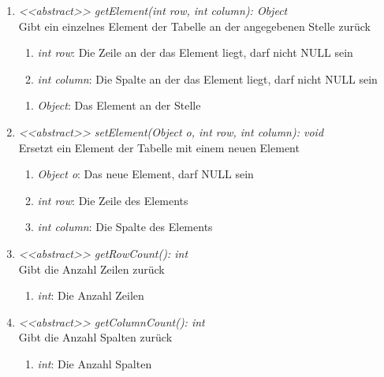 \begin{enumerate}[+]
	\item \textit{<{<abstract>}> getElement(int row, int column): Object} \\
	Gibt ein einzelnes Element der Tabelle an der angegebenen Stelle zurück
	\begin{enumerate}[$\bullet$]
		\item \textit{int row}: Die Zeile an der das Element liegt, darf nicht NULL sein
		\item \textit{int column}: Die Spalte an der das Element liegt, darf nicht NULL sein
	\end{enumerate}
	\vspace{-0.2cm}
	\begin{enumerate}[$\circ$]
		\item \textit{Object}: Das Element an der Stelle
	\end{enumerate}
	
	\item \textit{<{<abstract>}> setElement(Object o, int row, int column): void} \\
	Ersetzt ein Element der Tabelle mit einem neuen Element
	\begin{enumerate}[$\bullet$]
		\item \textit{Object o}: Das neue Element, darf NULL sein
		\item \textit{int row}: Die Zeile des Elements
		\item \textit{int column}: Die Spalte des Elements
	\end{enumerate}
	\vspace{-0.2cm}
	
	\item \textit{<{<abstract>}> getRowCount(): int} \\
	Gibt die Anzahl Zeilen zurück
	\vspace{-0.2cm}
	\begin{enumerate}[$\circ$]
		\item \textit{int}: Die Anzahl Zeilen
	\end{enumerate}

	\item \textit{<{<abstract>}> getColumnCount(): int} \\
	Gibt die Anzahl Spalten zurück
	\vspace{-0.2cm}
	\begin{enumerate}[$\circ$]
		\item \textit{int}: Die Anzahl Spalten
	\end{enumerate}


\end{enumerate}
